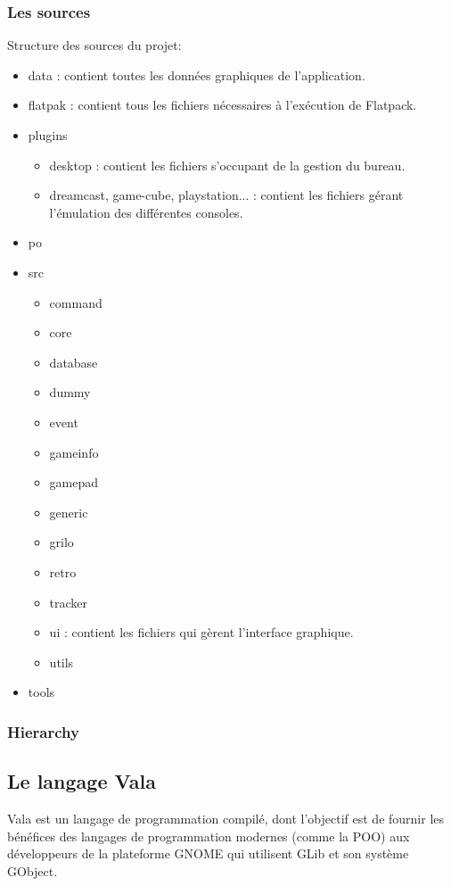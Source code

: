 \documentclass[12pt]{report}
\begin{document}
\subsubsection{Les sources}
Structure des sources du projet:
\begin{itemize}
\item data : contient toutes les données graphiques de l'application.
\item flatpak : contient tous les fichiers nécessaires à l'exécution de Flatpack.
\item plugins
\begin{itemize}
\item desktop : contient les fichiers s'occupant de la gestion du bureau.
\item dreamcast, game-cube, playstation... :  contient les fichiers gérant l'émulation des différentes consoles.
\end{itemize}
\item po
\item src
\begin{itemize}
\item command
\item core
\item database
\item dummy
\item event
\item gameinfo
\item gamepad
\item generic
\item grilo
\item retro
\item tracker
\item ui : contient les fichiers qui gèrent l'interface graphique.
\item utils
\end{itemize}
\item tools
\end{itemize}

\subsubsection{Hierarchy}


\subsection{Le langage Vala}
Vala est un langage de programmation compilé, dont l'objectif est de
fournir les bénéfices des langages de programmation modernes (comme la
POO) aux développeurs de la plateforme GNOME qui utilisent GLib et son
système GObject.
\end{document}
